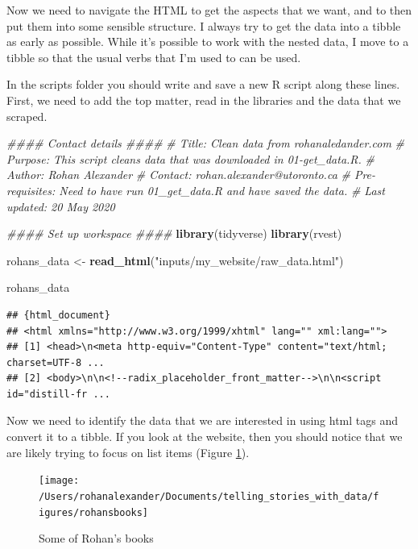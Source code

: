 \documentclass[
]{book}
\newenvironment{Shaded}{\begin{snugshade}}{\end{snugshade}}
\newcommand{\CommentTok}[1]{\textcolor[rgb]{0.56,0.35,0.01}{\textit{#1}}}
\newcommand{\KeywordTok}[1]{\textcolor[rgb]{0.13,0.29,0.53}{\textbf{#1}}}
\newcommand{\NormalTok}[1]{#1}
\newcommand{\StringTok}[1]{\textcolor[rgb]{0.31,0.60,0.02}{#1}}
\begin{document}
Now we need to navigate the HTML to get the aspects that we want, and to then put them into some sensible structure. I always try to get the data into a tibble as early as possible. While it's possible to work with the nested data, I move to a tibble so that the usual verbs that I'm used to can be used.

In the scripts folder you should write and save a new R script along these lines. First, we need to add the top matter, read in the libraries and the data that we scraped.

\begin{Shaded}
\begin{Highlighting}[]
\CommentTok{#### Contact details ####}
\CommentTok{# Title: Clean data from rohanaledander.com}
\CommentTok{# Purpose: This script cleans data that was downloaded in 01-get_data.R.}
\CommentTok{# Author: Rohan Alexander}
\CommentTok{# Contact: rohan.alexander@utoronto.ca}
\CommentTok{# Pre-requisites: Need to have run 01_get_data.R and have saved the data.}
\CommentTok{# Last updated: 20 May 2020}


\CommentTok{#### Set up workspace ####}
\KeywordTok{library}\NormalTok{(tidyverse)}
\KeywordTok{library}\NormalTok{(rvest)}

\NormalTok{rohans_data <-}\StringTok{ }\KeywordTok{read_html}\NormalTok{(}\StringTok{"inputs/my_website/raw_data.html"}\NormalTok{)}

\NormalTok{rohans_data}
\end{Highlighting}
\end{Shaded}

\begin{verbatim}
## {html_document}
## <html xmlns="http://www.w3.org/1999/xhtml" lang="" xml:lang="">
## [1] <head>\n<meta http-equiv="Content-Type" content="text/html; charset=UTF-8 ...
## [2] <body>\n\n<!--radix_placeholder_front_matter-->\n\n<script id="distill-fr ...
\end{verbatim}

Now we need to identify the data that we are interested in using html tags and convert it to a tibble. If you look at the website, then you should notice that we are likely trying to focus on list items (Figure \ref{fig:rohansbooks}).

\begin{figure}
\texttt{[image: /Users/rohanalexander/Documents/telling\_stories\_with\_data/figures/rohansbooks]} \caption{Some of Rohan's books}\label{fig:rohansbooks}
\end{figure}
\end{document}
